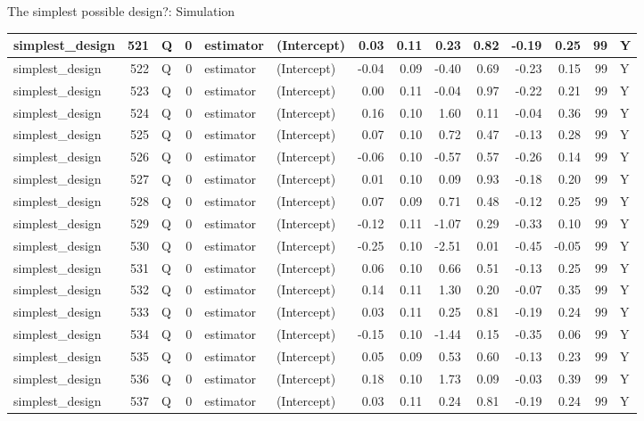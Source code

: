 \documentclass[
  11pt,
  ignorenonframetext,
]{beamer}
\begin{document}
\begin{frame}[fragile]{The simplest possible design?: Simulation}
\begin{tabular}{l|r|l|r|l|l|r|r|r|r|r|r|r|l}
\hline
simplest\_design & 521 & Q & 0 & estimator & (Intercept) & 0.03 & 0.11 & 0.23 & 0.82 & -0.19 & 0.25 & 99 & Y\\
\hline
simplest\_design & 522 & Q & 0 & estimator & (Intercept) & -0.04 & 0.09 & -0.40 & 0.69 & -0.23 & 0.15 & 99 & Y\\
\hline
simplest\_design & 523 & Q & 0 & estimator & (Intercept) & 0.00 & 0.11 & -0.04 & 0.97 & -0.22 & 0.21 & 99 & Y\\
\hline
simplest\_design & 524 & Q & 0 & estimator & (Intercept) & 0.16 & 0.10 & 1.60 & 0.11 & -0.04 & 0.36 & 99 & Y\\
\hline
simplest\_design & 525 & Q & 0 & estimator & (Intercept) & 0.07 & 0.10 & 0.72 & 0.47 & -0.13 & 0.28 & 99 & Y\\
\hline
simplest\_design & 526 & Q & 0 & estimator & (Intercept) & -0.06 & 0.10 & -0.57 & 0.57 & -0.26 & 0.14 & 99 & Y\\
\hline
simplest\_design & 527 & Q & 0 & estimator & (Intercept) & 0.01 & 0.10 & 0.09 & 0.93 & -0.18 & 0.20 & 99 & Y\\
\hline
simplest\_design & 528 & Q & 0 & estimator & (Intercept) & 0.07 & 0.09 & 0.71 & 0.48 & -0.12 & 0.25 & 99 & Y\\
\hline
simplest\_design & 529 & Q & 0 & estimator & (Intercept) & -0.12 & 0.11 & -1.07 & 0.29 & -0.33 & 0.10 & 99 & Y\\
\hline
simplest\_design & 530 & Q & 0 & estimator & (Intercept) & -0.25 & 0.10 & -2.51 & 0.01 & -0.45 & -0.05 & 99 & Y\\
\hline
simplest\_design & 531 & Q & 0 & estimator & (Intercept) & 0.06 & 0.10 & 0.66 & 0.51 & -0.13 & 0.25 & 99 & Y\\
\hline
simplest\_design & 532 & Q & 0 & estimator & (Intercept) & 0.14 & 0.11 & 1.30 & 0.20 & -0.07 & 0.35 & 99 & Y\\
\hline
simplest\_design & 533 & Q & 0 & estimator & (Intercept) & 0.03 & 0.11 & 0.25 & 0.81 & -0.19 & 0.24 & 99 & Y\\
\hline
simplest\_design & 534 & Q & 0 & estimator & (Intercept) & -0.15 & 0.10 & -1.44 & 0.15 & -0.35 & 0.06 & 99 & Y\\
\hline
simplest\_design & 535 & Q & 0 & estimator & (Intercept) & 0.05 & 0.09 & 0.53 & 0.60 & -0.13 & 0.23 & 99 & Y\\
\hline
simplest\_design & 536 & Q & 0 & estimator & (Intercept) & 0.18 & 0.10 & 1.73 & 0.09 & -0.03 & 0.39 & 99 & Y\\
\hline
simplest\_design & 537 & Q & 0 & estimator & (Intercept) & 0.03 & 0.11 & 0.24 & 0.81 & -0.19 & 0.24 & 99 & Y\\

\end{tabular}
\end{frame}
\end{document}
